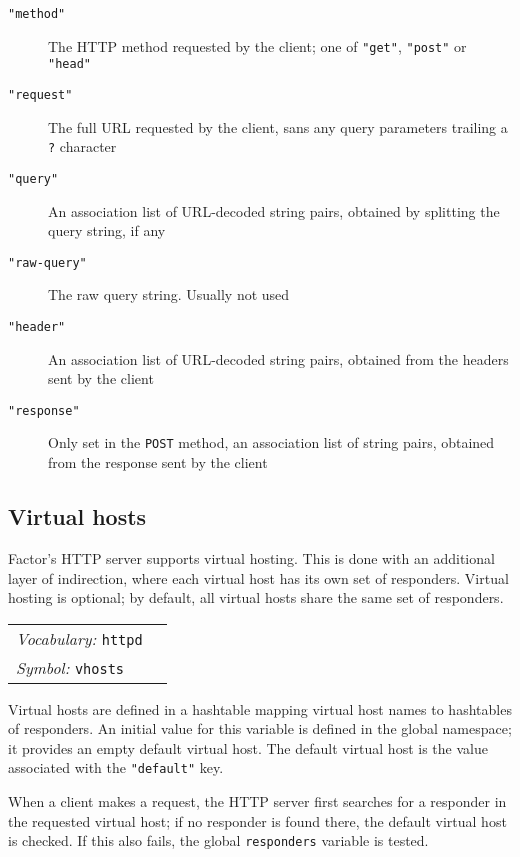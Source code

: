 \documentclass{book}
\newcommand{\vocabulary}[1]{\emph{Vocabulary:} \texttt{#1}&\\}
\newcommand{\symbolword}[1]{\index{\texttt{#1}}\emph{Symbol:} \texttt{#1}&\\}
\newcommand{\wordtable}[1]{


\begin{tabularx}{12cm}{lX}
\hline
#1
\hline
\end{tabularx}

}
\begin{document}
\begin{description}
\item[\texttt{"method"}] The HTTP method requested by the client; one of \texttt{"get"}, \texttt{"post"} or \texttt{"head"}
\item[\texttt{"request"}] The full URL requested by the client, sans any query parameters trailing a \verb|?| character
\item[\texttt{"query"}] An association list of URL-decoded string pairs, obtained by splitting the query string, if any
\item[\texttt{"raw-query"}] The raw query string. Usually not used
\item[\texttt{"header"}] An association list of URL-decoded string pairs, obtained from the headers sent by the client
\item[\texttt{"response"}] Only set in the \verb|POST| method, an association list of string pairs, obtained from the response sent by the client
\end{description}

\subsection{Virtual hosts}\label{vhosts}


Factor's HTTP server supports virtual hosting. This is done with an additional layer of indirection, where each virtual host has its own set of responders. Virtual hosting is optional; by default, all virtual hosts share the same set of responders.

\wordtable{
\vocabulary{httpd}
\symbolword{vhosts}
}

Virtual hosts are defined in a hashtable mapping virtual host names to hashtables of responders. An initial value for this variable is defined in the global namespace; it provides an empty default virtual host. The default virtual host is the value associated with the \verb|"default"| key.

When a client makes a request, the HTTP server first searches for a responder in the requested virtual host; if no responder is found there, the default virtual host is checked. If this also fails, the global \verb|responders| variable is tested.
\end{document}
